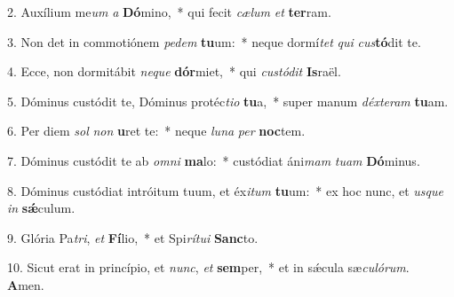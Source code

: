 2. Auxílium me\textit{um} \textit{a} \textbf{Dó}mino,~*  qui fecit \textit{cæ}\textit{lum} \textit{et} \textbf{ter}ram.\

3. Non det in commotiónem \textit{pe}\textit{dem} \textbf{tu}um:~*  neque dormí\textit{tet} \textit{qui} \textit{cus}\textbf{tó}dit te.\

4. Ecce, non dormitábit \textit{ne}\textit{que} \textbf{dór}miet,~*  qui \textit{cus}\textit{tó}\textit{dit} \textbf{Is}raël.\

5. Dóminus custódit te, Dóminus protéc\textit{ti}\textit{o} \textbf{tu}a,~*  super manum \textit{déx}\textit{te}\textit{ram} \textbf{tu}am.\

6. Per diem \textit{sol} \textit{non} \textbf{u}ret te:~*  neque \textit{lu}\textit{na} \textit{per} \textbf{noc}tem.\

7. Dóminus custódit te ab \textit{om}\textit{ni} \textbf{ma}lo:~*  custódiat áni\textit{mam} \textit{tu}\textit{am} \textbf{Dó}minus.\

8. Dóminus custódiat intróitum tuum, et éx\textit{i}\textit{tum} \textbf{tu}um:~*  ex hoc nunc, et \textit{us}\textit{que} \textit{in} \textbf{sǽ}culum.\

9. Glória Pa\textit{tri}, \textit{et} \textbf{Fí}lio,~*  et Spi\textit{rí}\textit{tu}\textit{i} \textbf{Sanc}to.\

10. Sicut erat in princípio, et \textit{nunc}, \textit{et} \textbf{sem}per,~*  et in sǽcula sæ\textit{cu}\textit{ló}\textit{rum}. \textbf{A}men.\


